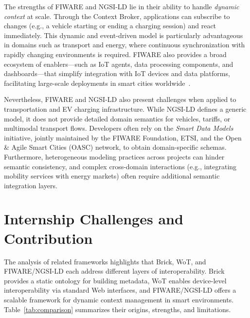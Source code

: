 The strengths of FIWARE and NGSI-LD lie in their ability to handle
\emph{dynamic context} at scale. Through the Context Broker,
applications can subscribe to changes (e.g., a vehicle starting or
ending a charging session) and react immediately. This dynamic and
event-driven model is particularly advantageous in domains such as
transport and energy, where continuous synchronization with rapidly
changing environments is required. FIWARE also provides a broad
ecosystem of enablers—such as IoT agents, data processing
components, and dashboards—that simplify integration with IoT
devices and data platforms, facilitating large-scale deployments in
smart cities worldwide~\cite{Papadakis2022NGSI}.

Nevertheless, FIWARE and NGSI-LD also present challenges when
applied to transportation and EV charging infrastructure. While
NGSI-LD defines a generic model, it does not provide detailed domain
semantics for vehicles, tariffs, or multimodal transport flows. Developers
often rely on the \emph{Smart Data Models} initiative, jointly maintained
by the FIWARE Foundation, ETSI, and the Open \& Agile Smart Cities
(OASC) network, to obtain domain-specific schemas. Furthermore,
heterogeneous modeling practices across projects can hinder semantic
consistency, and complex cross-domain interactions (e.g., integrating
mobility services with energy markets) often require additional semantic
integration layers. 

\section{Internship Challenges and Contribution}

The analysis of related frameworks highlights that Brick, WoT, and
FIWARE/NGSI-LD each address different layers of interoperability.
Brick provides a static ontology for building metadata, WoT enables
device-level interoperability via standard Web interfaces, and
FIWARE/NGSI-LD offers a scalable framework for dynamic context
management in smart environments. Table~\ref{tab:comparison}
summarizes their origins, strengths, and limitations.

